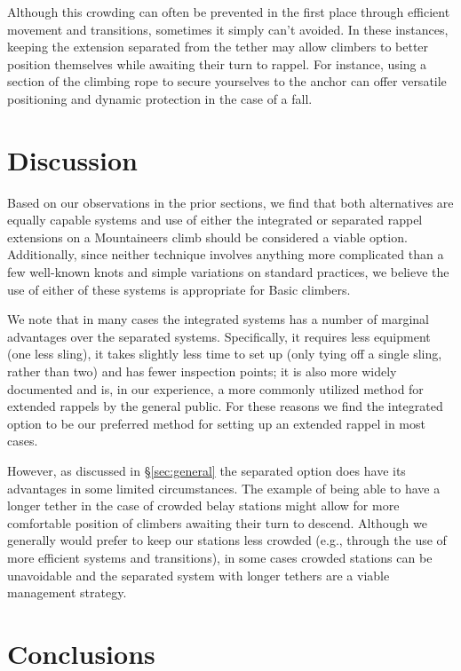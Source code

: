 \documentclass[nonacm,acmtog]{acmart}
\begin{document}
   Although this crowding can often be prevented in the first place through
   efficient movement and transitions, sometimes it simply can’t avoided.  In
   these instances, keeping the extension separated from the tether may allow
   climbers to better position themselves while awaiting their turn to rappel.
   For instance, using a section of the climbing rope to secure yourselves to
   the anchor can offer versatile positioning and dynamic protection in the
   case of a fall.

\section{Discussion}
\label{sec:discussion}

   Based on our observations in the prior sections, we find that both
   alternatives are equally capable systems and use of either the integrated or
   separated rappel extensions on a Mountaineers climb should be considered a
   viable option.  Additionally, since neither technique involves anything more
   complicated than a few well-known knots and simple variations on standard
   practices, we believe the use of either of these systems is appropriate for
   Basic climbers.

   We note that in many cases the integrated systems has a number of marginal
   advantages over the separated systems.  Specifically, it requires less
   equipment (one less sling), it takes slightly less time to set up (only
   tying off a single sling, rather than two) and has fewer inspection points;
   it is also more widely documented and is, in our experience, a more commonly
   utilized method for extended rappels by the general public.  For these
   reasons we find the integrated option to be our preferred method for setting
   up an extended rappel in most cases.

   However, as discussed in \S\ref{sec:general} the separated option does have
   its advantages in some limited circumstances.  The example of being able to
   have a longer tether in the case of crowded belay stations might allow for
   more comfortable position of climbers awaiting their turn to descend.
   Although we generally would prefer to keep our stations less crowded (e.g.,
   through the use of more efficient systems and transitions), in some cases
   crowded stations can be unavoidable and the separated system with longer
   tethers are a viable management strategy.

\section{Conclusions}
\label{sec:conclusions}
\end{document}
